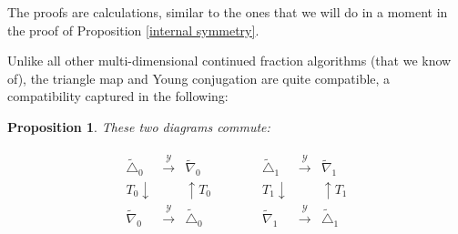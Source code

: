 \documentclass[12pt,oneside,openany]{article}
\newtheorem{prop}[theorem]{Proposition}
\begin{document}
The proofs are calculations, similar to the ones that we will do in a moment in the proof of Proposition \ref{internal symmetry}.

Unlike all other multi-dimensional continued fraction algorithms (that we know of), the triangle map and Young conjugation are quite compatible, a compatibility captured in the following:

\begin{prop} These two diagrams commute:

$$\begin{array}{ccccc}
  \begin{array}{ccc}
  \tilde{\triangle}_0 & \xrightarrow{\mathcal{Y}} & \tilde{\nabla}_0 \\
  T_0 \downarrow && \uparrow T_0 \\
   \tilde{\nabla}_0 & \xrightarrow{\mathcal{Y}} & \tilde{\triangle}_0
  \end{array}

& &&&
 \begin{array}{ccc}
  \tilde{\triangle}_1 & \xrightarrow{\mathcal{Y}} & \tilde{\nabla}_1 \\
  T_1 \downarrow && \uparrow T_1 \\
   \tilde{\nabla}_1 & \xrightarrow{\mathcal{Y}} & \tilde{\triangle}_1
  \end{array}
\end{array} $$






\end{prop}
\end{document}
